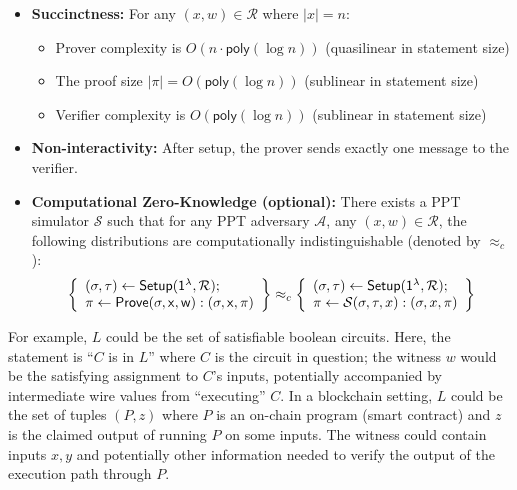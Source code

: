 \begin{definition}
\begin{itemize}
    \item \textbf{Succinctness:} For any $(x, w) \in \mathcal{R}$ where $|x| = n$:
    \begin{itemize}
        \item Prover complexity is $O(n \cdot \mathsf{poly}(\log n))$ (quasilinear in statement size)
        \item The proof size $|\pi| = O(\mathsf{poly}(\log n))$ (sublinear in statement size) 
        \item Verifier complexity is $O(\mathsf{poly}(\log n))$ (sublinear in statement size)
    \end{itemize}
    
    \item \textbf{Non-interactivity:} After setup, the prover sends exactly one message to the verifier.
    \item \textbf{Computational Zero-Knowledge (optional):} There exists a PPT simulator $\mathcal{S}$ such that for any PPT adversary $\mathcal{A}$, any $(x, w) \in \mathcal{R}$, the following distributions are computationally indistinguishable (denoted by $\approx_c$):
    \begin{align*}
    \left\{ \begin{array}{l}
    (\sigma, \tau) \leftarrow \sf{Setup}(1^{\lambda}, \mathcal{R}); \\
    \pi \leftarrow \sf{Prove}(\sigma, x, w) : (\sigma, x, \pi)
    \end{array} \right\} \approx_c
    \left\{ \begin{array}{l}
    (\sigma, \tau) \leftarrow \sf{Setup}(1^{\lambda}, \mathcal{R}); \\
    \pi \leftarrow \mathcal{S}(\sigma, \tau, x) : (\sigma, x, \pi)
    \end{array} \right\}
\end{align*}
\end{itemize}
\end{definition}

\noindent For example, $L$ could be the set of satisfiable boolean circuits. Here, the statement is ``$C$ is in $L$'' where $C$ is the circuit in question; the witness $w$ would be the satisfying assignment to $C$'s inputs, potentially accompanied by intermediate wire values from ``executing'' $C$. In a blockchain setting, $L$ could be the set of tuples $(P, z)$ where $P$ is an on-chain program (smart contract) and $z$ is the claimed output of running $P$ on some inputs. The witness could contain inputs $x, y$ and potentially other information needed to verify the output of the execution path through $P$.\\


